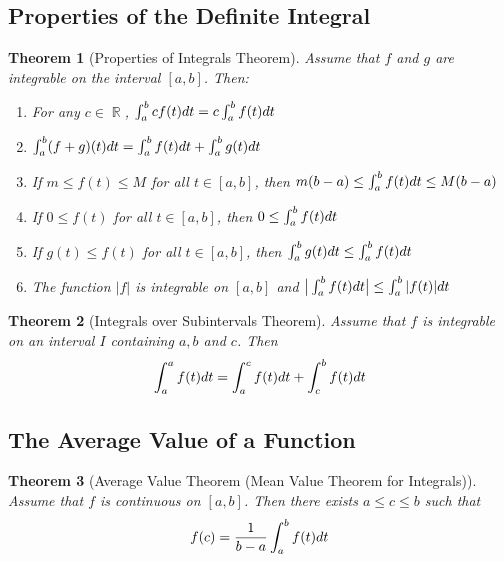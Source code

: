 \documentclass[10pt]{article}
\DeclareMathOperator{\R}{{\mathbb{R}}}
\theoremstyle{break}
\newtheorem{thm}{Theorem}[subsection]
\begin{document}
\subsection{Properties of the Definite Integral}
\begin{thm}[Properties of Integrals Theorem]
Assume that $f$ and $g$ are integrable on the interval $[a, b]$. Then:
\begin{enumerate}
    \item For any $c \in \R$, $\int^b_a c \space f(t) \space dt = c \int^b_a f(t) \space dt$
    \item $\int^b_a (f + g)(t) \space dt = \int^b_a f(t) \space dt + \int^b_a g(t) \space dt$
    \item If $m \le f(t) \le M$ for all $t \in [a, b]$, then $m(b-a) \le \int^b_a f(t) \space dt \le M(b-a)$
    \item If $0 \le f(t)$ for all $t \in [a, b]$, then $0 \le \int^b_a f(t) \space dt$
    \item If $g(t) \le f(t)$ for all $t \in [a, b]$, then $\int^b_a g(t) \space dt \le \int^b_a f(t) \space dt$
    \item The function $|f|$ is integrable on $[a,b]$ and $\big|\int^b_a f(t) \space dt \big| \le \int^b_a |f(t)| \space dt$
\end{enumerate}
\end{thm}
\begin{thm}[Integrals over Subintervals Theorem]
    Assume that $f$ is integrable on an interval $I$ containing $a, b$ and $c$. Then $$\int^a_a f(t) \space dt = \int^c_a f(t) \space dt + \int^b_c f(t) \space dt$$
\end{thm}
\subsection{The Average Value of a Function}
\begin{thm}[Average Value Theorem (Mean Value Theorem for Integrals)]
    Assume that $f$ is continuous on $[a, b]$. Then there exists $a \le c \le b$ such that $$f(c) = \dfrac{1}{b-a}\int^b_af(t) \space dt$$
\end{thm}
\end{document}
